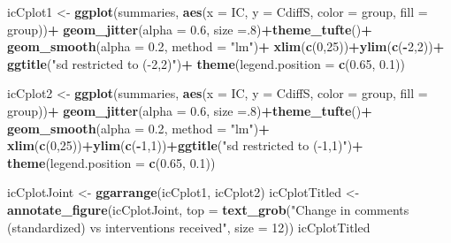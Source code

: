 \documentclass[10pt,dvipsnames,enabledeprecatedfontcommands]{scrartcl}
\newenvironment{Shaded}{\begin{snugshade}}{\end{snugshade}}
\newcommand{\DataTypeTok}[1]{\textcolor[rgb]{0.13,0.29,0.53}{#1}}
\newcommand{\DecValTok}[1]{\textcolor[rgb]{0.00,0.00,0.81}{#1}}
\newcommand{\FloatTok}[1]{\textcolor[rgb]{0.00,0.00,0.81}{#1}}
\newcommand{\KeywordTok}[1]{\textcolor[rgb]{0.13,0.29,0.53}{\textbf{#1}}}
\newcommand{\NormalTok}[1]{#1}
\newcommand{\OperatorTok}[1]{\textcolor[rgb]{0.81,0.36,0.00}{\textbf{#1}}}
\newcommand{\StringTok}[1]{\textcolor[rgb]{0.31,0.60,0.02}{#1}}
\begin{document}
\begin{Shaded}
\begin{Highlighting}[]
\NormalTok{icCplot1 <-}\StringTok{ }\KeywordTok{ggplot}\NormalTok{(summaries, }\KeywordTok{aes}\NormalTok{(}\DataTypeTok{x =}\NormalTok{ IC, }\DataTypeTok{y =}\NormalTok{ CdiffS, }\DataTypeTok{color =}\NormalTok{ group, }\DataTypeTok{fill =}\NormalTok{ group))}\OperatorTok{+}
\StringTok{  }\KeywordTok{geom_jitter}\NormalTok{(}\DataTypeTok{alpha =} \FloatTok{0.6}\NormalTok{, }\DataTypeTok{size =}\NormalTok{.}\DecValTok{8}\NormalTok{)}\OperatorTok{+}\KeywordTok{theme_tufte}\NormalTok{()}\OperatorTok{+}
\StringTok{  }\KeywordTok{geom_smooth}\NormalTok{(}\DataTypeTok{alpha =} \FloatTok{0.2}\NormalTok{, }\DataTypeTok{method =} \StringTok{"lm"}\NormalTok{)}\OperatorTok{+}
\StringTok{  }\KeywordTok{xlim}\NormalTok{(}\KeywordTok{c}\NormalTok{(}\DecValTok{0}\NormalTok{,}\DecValTok{25}\NormalTok{))}\OperatorTok{+}\KeywordTok{ylim}\NormalTok{(}\KeywordTok{c}\NormalTok{(}\OperatorTok{-}\DecValTok{2}\NormalTok{,}\DecValTok{2}\NormalTok{))}\OperatorTok{+}
\StringTok{  }\KeywordTok{ggtitle}\NormalTok{(}\StringTok{"sd restricted to (-2,2)"}\NormalTok{)}\OperatorTok{+}
\StringTok{  }\KeywordTok{theme}\NormalTok{(}\DataTypeTok{legend.position =} \KeywordTok{c}\NormalTok{(}\FloatTok{0.65}\NormalTok{, }\FloatTok{0.1}\NormalTok{))}

\NormalTok{icCplot2 <-}\StringTok{  }\KeywordTok{ggplot}\NormalTok{(summaries, }\KeywordTok{aes}\NormalTok{(}\DataTypeTok{x =}\NormalTok{ IC, }\DataTypeTok{y =}\NormalTok{ CdiffS, }\DataTypeTok{color =}\NormalTok{ group, }\DataTypeTok{fill =}\NormalTok{ group))}\OperatorTok{+}
\StringTok{  }\KeywordTok{geom_jitter}\NormalTok{(}\DataTypeTok{alpha =} \FloatTok{0.6}\NormalTok{, }\DataTypeTok{size =}\NormalTok{.}\DecValTok{8}\NormalTok{)}\OperatorTok{+}\KeywordTok{theme_tufte}\NormalTok{()}\OperatorTok{+}
\StringTok{  }\KeywordTok{geom_smooth}\NormalTok{(}\DataTypeTok{alpha =} \FloatTok{0.2}\NormalTok{, }\DataTypeTok{method =} \StringTok{"lm"}\NormalTok{)}\OperatorTok{+}
\StringTok{  }\KeywordTok{xlim}\NormalTok{(}\KeywordTok{c}\NormalTok{(}\DecValTok{0}\NormalTok{,}\DecValTok{25}\NormalTok{))}\OperatorTok{+}\KeywordTok{ylim}\NormalTok{(}\KeywordTok{c}\NormalTok{(}\OperatorTok{-}\DecValTok{1}\NormalTok{,}\DecValTok{1}\NormalTok{))}\OperatorTok{+}\KeywordTok{ggtitle}\NormalTok{(}\StringTok{"sd restricted to (-1,1)"}\NormalTok{)}\OperatorTok{+}
\StringTok{  }\KeywordTok{theme}\NormalTok{(}\DataTypeTok{legend.position =} \KeywordTok{c}\NormalTok{(}\FloatTok{0.65}\NormalTok{, }\FloatTok{0.1}\NormalTok{))}

\NormalTok{icCplotJoint <-}\StringTok{ }\KeywordTok{ggarrange}\NormalTok{(icCplot1, icCplot2) }
\NormalTok{icCplotTitled <-}\StringTok{ }\KeywordTok{annotate_figure}\NormalTok{(icCplotJoint, }
  \DataTypeTok{top =} \KeywordTok{text_grob}\NormalTok{(}\StringTok{"Change in comments (standardized) vs interventions received"}\NormalTok{,}
   \DataTypeTok{size =} \DecValTok{12}\NormalTok{))}
\NormalTok{icCplotTitled}
\end{Highlighting}
\end{Shaded}
\end{document}

